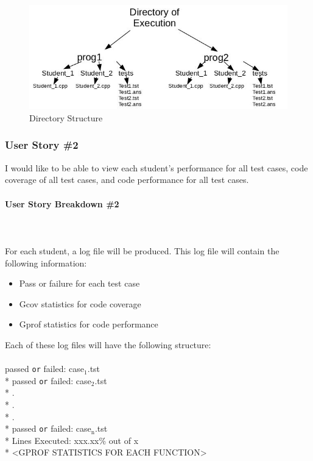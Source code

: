 \documentclass {article}
\begin{document}
	 				\begin{figure}[h!]
	 					\centering
							\includegraphics[width=0.7\linewidth]{Figure1.jpg}
							\caption{Directory Structure}
							\label{fig:Directory_Structure}
					\end{figure}
					
	 		\subsubsection{\large{\color{cyan}User Story \#2}}
	 			I would like to be able to view each student's performance for all test
	 			 cases, code coverage of all test cases, and code performance for all test
	 			 cases.
	 			\paragraph{\textbf{User Story Breakdown \#2}}
					\ \\ \ \\For each student, a log file will be produced. This log file will
					 contain the following information:
					 	\begin{itemize}
				 		\item Pass or failure for each test case
				 		\item Gcov statistics for code coverage
				 		\item Gprof statistics for code performance
				 	\end{itemize}
					 	
					Each of these log files will have the following structure:\\\\
					
					\centering
						\indent	passed {\tt or} failed:	\indent case$_{\text{1}}$.tst \\*
						\indent	passed {\tt or} failed:	\indent case$_{\text{2}}$.tst \\*
						\indent \indent \indent \indent \indent \indent	.				 \\*
						\indent \indent \indent \indent \indent \indent	.				 \\*
						\indent \indent \indent \indent \indent \indent	.				 \\*
						\indent	passed {\tt or} failed:	\indent case$_{\text{n}}$.tst \\*
						\indent Lines Executed: xxx.xx\% out of x\\*
						\indent \textless GPROF STATISTICS FOR EACH FUNCTION\textgreater
						
\end{document}
